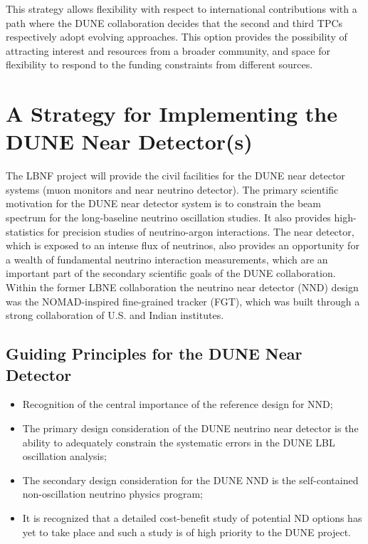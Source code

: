 This strategy allows flexibility with respect to international contributions with 
a path where the DUNE collaboration decides that the second and third TPCs respectively 
adopt evolving approaches. This option provides the possibility of attracting interest 
and resources from a broader community, and space for flexibility to respond to 
the funding constraints from different sources. 

\section{A Strategy for Implementing the DUNE Near Detector(s)}

The LBNF project will provide the civil facilities for the DUNE near detector systems 
(muon monitors and near neutrino detector). The primary scientific motivation for 
the DUNE near detector system is to constrain the beam spectrum for the long-baseline 
neutrino oscillation studies. It also provides high-statistics for precision studies 
of neutrino-argon interactions. The near detector, which is exposed to an intense 
flux of neutrinos, also provides an opportunity for a wealth of fundamental neutrino 
interaction measurements, which are an important part of the secondary scientific 
goals of the DUNE collaboration. Within the former LBNE collaboration the neutrino 
near detector (NND) design was the NOMAD-inspired fine-grained tracker (FGT), which 
was built through a strong collaboration of U.S. and Indian institutes.

\subsection{Guiding Principles for the DUNE Near Detector}

\begin{itemize}
\item Recognition of the central importance of the reference design for NND;

\item  The primary design consideration of the DUNE neutrino near detector is the 
ability to adequately constrain the systematic errors in the DUNE LBL oscillation 
analysis; 
\item The secondary design consideration for the DUNE NND is the self-contained non-oscillation 
neutrino physics program;

\item It is recognized that a detailed cost-benefit study of potential ND options 
has yet to take place and such a study is of high priority to the DUNE project.
\end{itemize}

